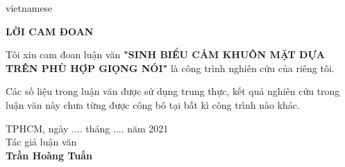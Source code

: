 \begin{titlepage}
\begin{otherlanguage*}{vietnamese}

\begin{center}
    \fontsize{18}{18}\textbf{LỜI CAM ĐOAN}
\end{center}

Tôi xin cam đoan luận văn \textbf{"SINH BIỂU CẢM KHUÔN MẶT DỰA TRÊN PHÙ HỢP GIỌNG NÓI"} là công trình nghiên cứu của riêng tôi.
\par
Các số liệu trong luận văn được sử dụng trung thực, kết quả nghiên cứu trong luận văn này chưa từng được công bô tại bất kì công trình nào khác.

\begin{flushright}
    \begin{minipage}[t]{0.40\textwidth}
    \begin{center}
        TPHCM, ngày .... tháng .... năm 2021\\
        Tác giả luận văn\\
        \vspace{3cm}
        \textbf{Trần Hoàng Tuấn}
    \end{center}
    \end{minipage}
\end{flushright}


\end{otherlanguage*}
\vfill
\end{titlepage}